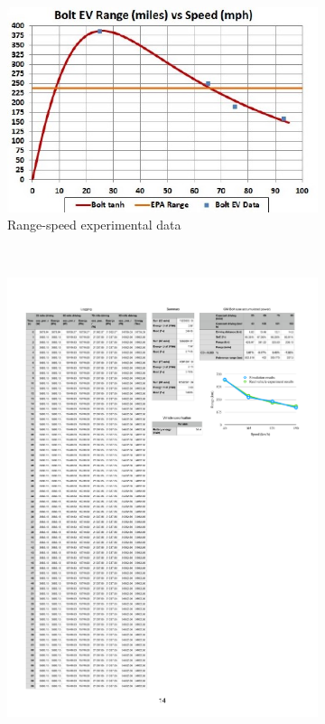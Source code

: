 \documentclass{IEEEtran}
\begin{document}
\begin{figure}   %
\centering
	\begin{subfigure}{0.4\textwidth}
	\includegraphics[width=\hsize]{Figures/Bolt_EV_range.jpg}
	\caption{Range-speed experimental data}
	\label{fig:range_speed_exp}
	\end{subfigure}
~
	\begin{subfigure}{0.4\textwidth}
	\includegraphics[width=\hsize]{Figures/Range-speed_validation.pdf}

\end{subfigure}
\end{figure}
\end{document}
